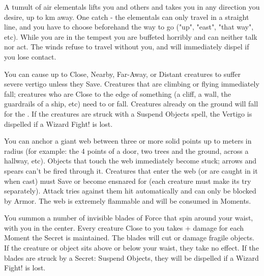 A tumult of air elementals lifts you and  others and takes you in any direction you desire, up to \SUMDICE km away.   One catch - the elementals can only travel in a straight line, and you have to choose beforehand the way to go ("up", "east", "that way", etc).  While you are in the tempest you are buffeted horribly and can neither talk nor act.  The winds refuse to travel without you, and will immediately dispel if you lose contact.


\WIZARDRY[
  Name=Vertigo,
  Link=secrets-vertigo,
  Alignment=Mind,
  Save=Y (negate),
  Duration=\DICE,
  Counter=\mylink{Suspend Objects}{secrets-suspend-objects} ,
  Keywords=None,
  Target= Any Distance
]

You can cause up to \DICE Close, Nearby, Far-Away, or Distant creatures to suffer severe vertigo unless they Save.  Creatures that are climbing or
flying immediately fall; creatures who are Close to the edge of something (a cliff, a wall, the guardrails of a ship, etc) need to \RSTRY{\FOC} or fall.
Creatures already on the ground will fall  for the \Duration. If the creatures are struck with a Suspend Objects spell, the Vertigo is dispelled if a Wizard Fight! is lost.

\newpage

\WIZARDRY[
  Name=Web,
  Link=secrets-web,
  Alignment=Entropy,
  Save=Y (negate),
  Duration=\DICE,
  Counter=None ,
  Keywords=None,
  Target=Nearby or Far Away Area
]

You can anchor a giant web between three or more solid points up to \DICE meters in radius (for example: the 4 points of a door, two trees and the ground, across a hallway, etc).  Objects that touch the web immediately become stuck; arrows and spears can't be fired through it.  Creatures that enter the web (or are caught in it when cast) must Save or become ensnared for \Duration (each creature must make its \Duration try separately). Attack tries against them hit automatically and can only be blocked by Armor.  The web is extremely flammable and will be consumed in \DICE Moments.


\WIZARDRY[
  Name=Whirling Blades,
  Link=secrets-whirling-blades,
  Alignment=Entropy,
  Save=N,
  Duration=Concentration,
  Counter=\mylink{Suspend Objects}{secrets-suspend-objects} ,
  Keywords=None,
  Target=Self
]

You summon a number of invisible blades of Force that spin around your waist, with you in the center.  Every creature Close to you takes \DICE+\DICE
damage for each Moment the Secret is maintained.  The blades will cut or damage fragile objects.  If the creature or object sits above or below your waist, they take no effect.  If the blades are struck by a Secret: Suspend Objects, they will be dispelled if a Wizard Fight! is lost.
